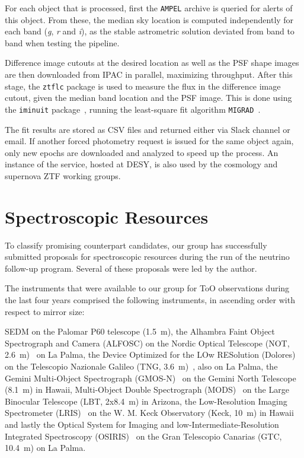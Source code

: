 For each object that is processed, first the \texttt{AMPEL} archive is queried for alerts of this object. From these, the median sky location is computed independently for each band (\textit{g}, \textit{r} and \textit{i}), as the stable astrometric solution deviated from band to band when testing the pipeline.

Difference image cutouts at the desired location as well as the PSF shape images are then downloaded from IPAC in parallel, maximizing throughput. After this stage, the \texttt{ztflc} package is used to measure the flux in the difference image cutout, given the median band location and the PSF image. This is done using the \texttt{iminuit} package~, running the least-square fit algorithm \texttt{MIGRAD}~.

The fit results are stored as CSV files and returned either via Slack channel or email. If another forced photometry request is issued for the same object again, only new epochs are downloaded and analyzed to speed up the process. An instance of the service, hosted at DESY, is also used by the cosmology and supernova ZTF working groups.

\section{Spectroscopic Resources}\label{spec_resources}
To classify promising counterpart candidates, our group has successfully submitted proposals for spectroscopic resources during the run of the neutrino follow-up program. Several of these proposals were led by the author.

The instruments that were available to our group for ToO observations during the last four years comprised the following instruments, in ascending order with respect to mirror size:

SEDM on the Palomar P60 telescope (\SI{1.5}{\meter}), the Alhambra Faint Object Spectrograph and Camera (ALFOSC) on the Nordic Optical Telescope (NOT, \SI{2.6}{\meter})~ on La Palma, the Device Optimized for the LOw RESolution (Dolores) on the Telescopio Nazionale Galileo (TNG, \SI{3.6}{\meter})~, also on La Palma, the Gemini Multi-Object Spectrograph (GMOS-N)~ on the Gemini North Telescope (\SI{8.1}{\meter}) in Hawaii, Multi-Object Double Spectrograph (MODS)~ on the Large Binocular Telescope (LBT, 2x\SI{8.4}{\meter}) in Arizona, the Low-Resolution Imaging Spectrometer (LRIS)~ on the W. M. Keck Observatory (Keck, \SI{10}{\meter}) in Hawaii and lastly the Optical System for Imaging and low-Intermediate-Resolution Integrated Spectroscopy (OSIRIS)~ on the Gran Telescopio Canarias (GTC, \SI{10.4}{\meter}) on La Palma.

